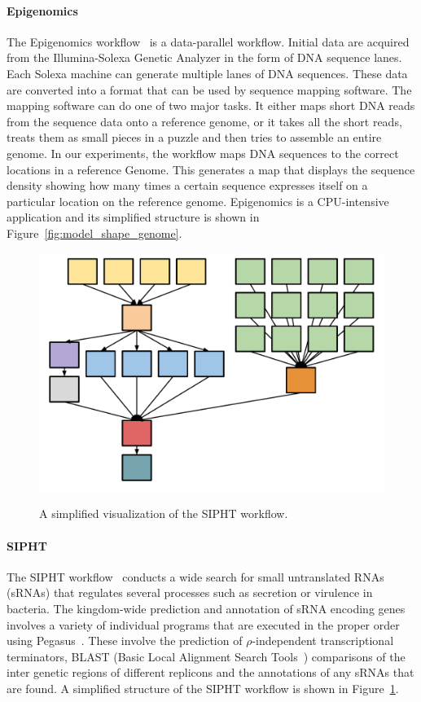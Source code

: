 \paragraph{\textbf{Epigenomics}}
The Epigenomics workflow~\cite{Epigenome} is a data-parallel workflow. Initial data are acquired from the Illumina-Solexa Genetic Analyzer in the form of DNA sequence lanes. Each Solexa machine can generate multiple lanes of DNA sequences. These data are converted into a format that can be used by sequence mapping software. The mapping software can do one of two major tasks. It either maps short DNA reads from the sequence data onto a reference genome, or it takes all the short reads, treats them as small pieces in a puzzle and then tries to assemble an entire genome. In our experiments, the workflow maps DNA sequences to the correct locations in a reference Genome. This generates a map that displays the sequence density showing how many times a certain sequence expresses itself on a particular location on the reference genome. Epigenomics is a CPU-intensive application and its simplified structure is shown in Figure~\ref{fig:model_shape_genome}. 

\begin{figure}[htb]
	\centering
	\includegraphics[width=0.6\linewidth]{figures/workflowsim/sipht_shape.pdf} \\
	\caption{A simplified visualization of the SIPHT workflow.}
	\label{fig:model_shape_sipht}
\end{figure}

\paragraph{\textbf{SIPHT}}
The SIPHT workflow~\cite{SIPHT} conducts a wide search for small untranslated RNAs (sRNAs) that regulates several processes such as secretion or virulence in bacteria. The kingdom-wide prediction and annotation of sRNA encoding genes involves a variety of individual programs that are executed in the proper order using Pegasus~\cite{Deelman2004}. These involve the prediction of $\rho$-independent transcriptional terminators, BLAST (Basic Local Alignment Search Tools~\cite{BLAST}) comparisons of the inter genetic regions of different replicons and the annotations of any sRNAs that are found. A simplified structure of the SIPHT workflow is shown in Figure~\ref{fig:model_shape_sipht}. 




